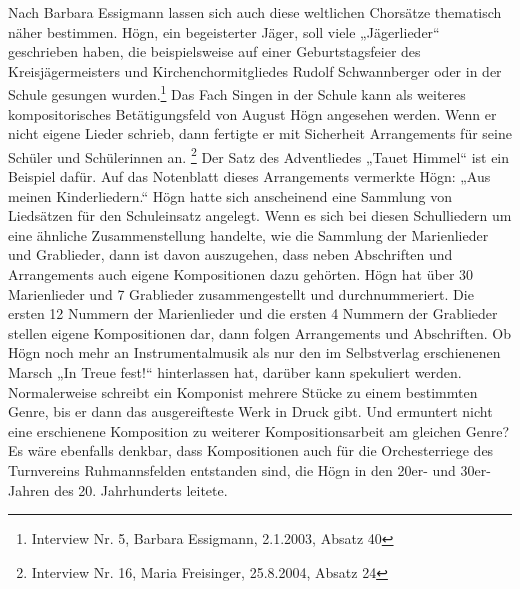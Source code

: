 Nach Barbara Essigmann lassen sich auch diese weltlichen Chorsätze
thematisch näher bestimmen. Högn, ein begeisterter Jäger, soll viele
„Jägerlieder“ geschrieben haben, die beispielsweise auf einer
Geburtstagsfeier des Kreisjägermeisters und Kirchenchormitgliedes
Rudolf Schwannberger oder in der Schule gesungen wurden.\footnote{
Interview Nr. 5, Barbara Essigmann, 2.1.2003, Absatz 40} Das Fach
Singen in der Schule kann als weiteres kompositorisches Betätigungsfeld
von August Högn angesehen werden. Wenn er nicht eigene Lieder schrieb,
dann fertigte er mit Sicherheit Arrangements für seine Schüler und
Schülerinnen an. \footnote{Interview Nr. 16, Maria Freisinger,
25.8.2004, Absatz 24} Der Satz des Adventliedes „Tauet Himmel“ ist ein
Beispiel dafür. Auf das Notenblatt dieses Arrangements vermerkte Högn:
„Aus meinen Kinderliedern.“ Högn hatte sich anscheinend eine Sammlung
von Liedsätzen für den Schuleinsatz angelegt. Wenn es sich bei diesen
Schulliedern um eine ähnliche Zusammenstellung handelte, wie die
Sammlung der Marienlieder und Grablieder, dann ist davon auszugehen,
dass neben Abschriften und Arrangements auch eigene Kompositionen dazu
gehörten. Högn hat über 30 Marienlieder und 7 Grablieder
zusammengestellt und durchnummeriert. Die ersten 12 Nummern der
Marienlieder und die ersten 4 Nummern der Grablieder stellen eigene
Kompositionen dar, dann folgen Arrangements und Abschriften. Ob Högn
noch mehr an Instrumentalmusik als nur den im Selbstverlag erschienenen
Marsch „In Treue fest!“ hinterlassen hat, darüber kann spekuliert
werden. Normalerweise schreibt ein Komponist mehrere Stücke zu einem
bestimmten Genre, bis er dann das ausgereifteste Werk in Druck gibt.
Und ermuntert nicht eine erschienene Komposition zu weiterer
Kompositionsarbeit am gleichen Genre? Es wäre ebenfalls denkbar, dass
Kompositionen auch für die Orchesterriege des Turnvereins
Ruhmannsfelden entstanden sind, die Högn in den 20er- und 30er-Jahren
des 20. Jahrhunderts leitete.
